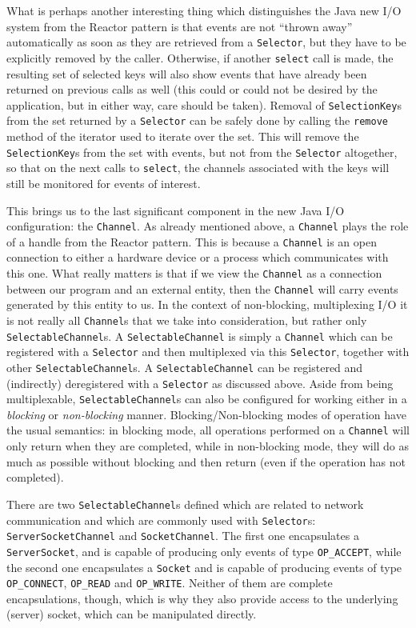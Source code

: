 \documentclass[a4paper,10pt]{article}
\begin{document}
What is perhaps another interesting thing which distinguishes the Java new I/O system from the Reactor pattern is that
events are not ``thrown away'' automatically as soon as they are retrieved from a \texttt{Selector}, but they have to be
explicitly removed by the caller. Otherwise, if another \texttt{select} call is made, the resulting set of selected keys will
also show events that have already been returned on previous calls as well (this could or could not be desired by the application,
but in either way, care should be taken). Removal of \texttt{SelectionKey}s from the set returned by a \texttt{Selector}
can be safely done by calling the \texttt{remove} method of the iterator used to iterate over the set. This will remove the
\texttt{SelectionKey}s from the set with events, but not from the \texttt{Selector} altogether, so that on the next calls
to \texttt{select}, the channels associated with the keys will still be monitored for events of interest.

This brings us to the last significant component in the new Java I/O configuration: the \texttt{Channel}. As already mentioned
above, a \texttt{Channel} plays the role of a handle from the Reactor pattern. This is because a \texttt{Channel} is an open
connection to either a hardware device or a process which communicates with this one. What really matters is that if we view
the \texttt{Channel} as a connection between our program and an external entity, then the \texttt{Channel} will carry events generated
by this entity to us. In the context of non-blocking, multiplexing I/O it is not really all \texttt{Channel}s that we take into
consideration, but rather only \texttt{SelectableChannel}s. A \texttt{SelectableChannel} is simply a \texttt{Channel} which
can be registered with a \texttt{Selector} and then multiplexed via this \texttt{Selector}, together with other \texttt{SelectableChannel}s.
A \texttt{SelectableChannel} can be registered and (indirectly) deregistered with a \texttt{Selector} as discussed above.
Aside from being multiplexable, \texttt{SelectableChannel}s can also be configured for working either in a \textit{blocking}
or \textit{non-blocking} manner. Blocking/Non-blocking modes of operation have the usual semantics: in blocking mode, all operations
performed on a \texttt{Channel} will only return when they are completed, while in non-blocking mode, they will do as much
as possible without blocking and then return (even if the operation has not completed).

There are two \texttt{SelectableChannel}s defined which are related to network communication and which are commonly used
with \texttt{Selector}s: \texttt{ServerSocketChannel} and \texttt{SocketChannel}. The first one encapsulates a \texttt{ServerSocket},
and is capable of producing only events of type \texttt{OP\_ACCEPT}, while the second one encapsulates a \texttt{Socket} and
is capable of producing events of type \texttt{OP\_CONNECT}, \texttt{OP\_READ} and \texttt{OP\_WRITE}. Neither of them are
complete encapsulations, though, which is why they also provide access to the underlying (server) socket, which can be manipulated
directly.
\end{document}

